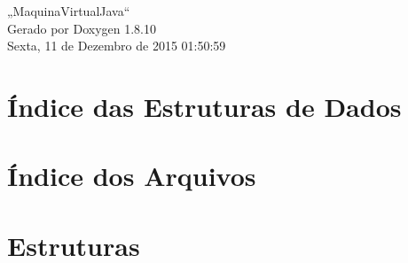 \documentclass[twoside]{book}
\newcommand{\+}{\discretionary{\mbox{\scriptsize$\hookleftarrow$}}{}{}}
\newcommand{\clearemptydoublepage}{%
  \newpage{\pagestyle{empty}\cleardoublepage}%
}
\begin{document}
\hypersetup{pageanchor=false,
             bookmarks=true,
             bookmarksnumbered=true,
             pdfencoding=unicode
            }
\begin{titlepage}
\vspace*{7cm}
\begin{center}%
{\Large „\+Maquina\+Virtual\+Java“ }\\
\vspace*{1cm}
{\large Gerado por Doxygen 1.8.10}\\
\vspace*{0.5cm}
{\small Sexta, 11 de Dezembro de 2015 01:50:59}\\
\end{center}
\end{titlepage}
\clearemptydoublepage
\tableofcontents
\clearemptydoublepage
{}
\hypersetup{pageanchor=true}

\chapter{Índice das Estruturas de Dados}

\chapter{Índice dos Arquivos}

\chapter{Estruturas}

























\end{document}
